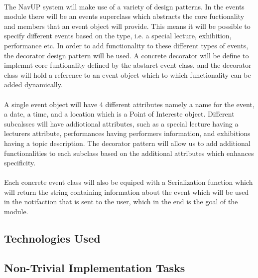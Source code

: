\documentclass{article}
\begin{document}
\paragraph{} The NavUP system will make use of a variety of design patterns. In the events module there will be an events superclass which abstracts the core fuctionality and members that an event object will provide. This means it will be possible to specify different events based on the type, i.e. a special lecture, exhibition, performance etc. In order to add functionality to these different types of events, the decorator design pattern will be used. A concrete decorator will be define to implemnt core funtionality defined by the abstarct event class, and the decorator class will hold a reference to an event object which to which functionality can be added dynamically.

\paragraph{} A single event object will have 4 different attributes namely a name for the event, a date, a time, and a location which is a Point of Intereste object. Different subcalsses will have addiotional attributes, such as a special lecture having a lecturers attribute, performances having performers information, and exhibitions having a topic description. The decorator pattern will allow us to add additional functionalities to each subclass based on the additional attributes which enhances specificity. 

\paragraph{} Each concrete event class will also be equiped with a Serialization function which will return the string containing information about the event which will be used in the notifaction that is sent to the user, which in the end is the goal of the module.  

\subsection{Technologies Used}
\paragraph{}


\subsection{Non-Trivial Implementation Tasks}
\end{document}
